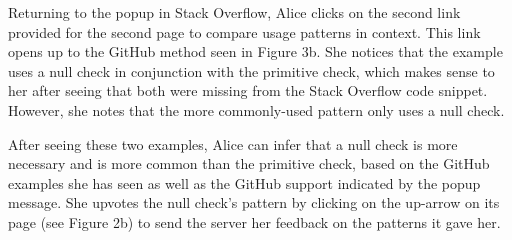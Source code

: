 Returning to the popup in Stack Overflow, Alice clicks on the second link provided for the second page to compare usage patterns in context. This link opens up to the GitHub method seen in Figure 3b. She notices that the example uses a null check in conjunction with the primitive check, which makes sense to her after seeing that both were missing from the Stack Overflow code snippet. However, she notes that the more commonly-used pattern only uses a null check.

After seeing these two examples, Alice can infer that a null check is more necessary and is more common than the primitive check, based on the GitHub examples she has seen as well as the GitHub support indicated by the popup message. She upvotes the null check's pattern by clicking on the up-arrow on its page (see Figure 2b) to send the server her feedback on the patterns it gave her. 


